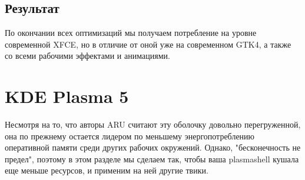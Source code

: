 \documentclass[letterpaper,10pt,russian,openany]{sphinxmanual}
\begin{document}
\ignorespaces 

\subsection{Результат}
\label{\detokenize{source/de-optimizations:gnome-result}}\label{\detokenize{source/de-optimizations:index-7}}\label{\detokenize{source/de-optimizations:id3}}
\sphinxAtStartPar
По окончании всех оптимизаций мы получаем потребление на уровне современной XFCE,
но в отличие от оной уже на современном GTK4, а также со всеми рабочими эффектами и анимациями.

\noindent{}

\sphinxAtStartPar
{}

\sphinxAtStartPar
{}

\sphinxAtStartPar
{}

\sphinxAtStartPar
{}

\ignorespaces 

\section{KDE Plasma 5}
\label{\detokenize{source/de-optimizations:kde-plasma-5}}\label{\detokenize{source/de-optimizations:plasma-optimization}}\label{\detokenize{source/de-optimizations:index-8}}
\sphinxAtStartPar
Несмотря на то, что авторы ARU считают эту оболочку довольно перегруженной,
она по прежнему остается лидером по меньшему энергопотреблению оперативной памяти среди других рабочих окружений.
Однако, "бесконечность \sphinxhyphen{} не предел", поэтому в этом разделе мы сделаем так,
чтобы ваша plasma\sphinxhyphen{}shell кушала еще меньше ресурсов, и применим на ней другие твики.

\ignorespaces 
\end{document}
